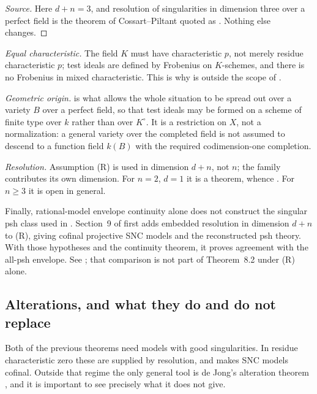 \begin{proof}[Source]
Here $d+n=3$, and resolution of singularities in dimension three over a
perfect field is the theorem of Cossart--Piltant quoted as
\cite[Theorem~6.3]{GJKM19}.  Nothing else changes.
\end{proof}

\begin{remark}
\label{rem:ch23-gjkm-hypotheses}
\emph{Equal characteristic.}  The field $K$ must have characteristic
$p$, not merely residue characteristic $p$; test ideals are defined by
Frobenius on $K$-schemes, and there is no Frobenius in mixed
characteristic.  This is why  is outside the
scope of .

\emph{Geometric origin.}   is what allows
the whole situation to be spread out over a variety $B$ over a perfect
field, so that test ideals may be formed on a scheme of finite type over
$k$ rather than over $K^\circ$.  It is a restriction on $X$, not a
normalization: a general variety over the completed field is not assumed to descend
to a function field $k(B)$ with the required codimension-one completion.

\emph{Resolution.}  Assumption \textup{(R)} is used in dimension $d+n$,
not $n$; the family contributes its own dimension.  For $n=2$,
$d=1$ it is a theorem, whence
.  For $n\geq3$ it is open in general.

Finally, rational-model envelope continuity alone does not construct the
singular psh class used in .  Section~9 of
\cite{GJKM19} first adds embedded resolution in dimension $d+n$ to
\textup{(R)}, giving cofinal projective SNC models and the reconstructed
psh theory.  With those hypotheses and the continuity theorem, it proves
agreement with the all-psh envelope.  See
; that comparison is not part of
Theorem~8.2 under \textup{(R)} alone.
\end{remark}

\subsection{Alterations, and what they do and do not replace}
\label{sec:ch23-later-alterations}

Both of the previous theorems need models with good singularities.  In
residue characteristic zero these are supplied by resolution, and
 makes SNC models cofinal.  Outside that regime the
only general tool is de Jong's alteration theorem
, and it is important to see precisely what it does
not give.

